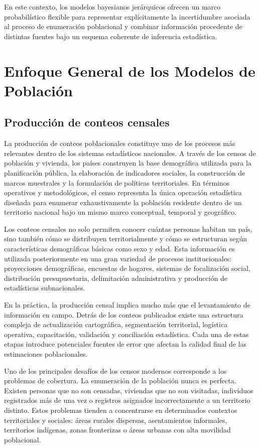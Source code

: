 \documentclass[
  spanish,
]{book}
\begin{document}
En este contexto, los modelos bayesianos jerárquicos ofrecen un marco probabilístico flexible para representar explícitamente la incertidumbre asociada al proceso de enumeración poblacional y combinar información procedente de distintas fuentes bajo un esquema coherente de inferencia estadística.

\chapter{Enfoque General de los Modelos de Población}\label{enfoque-general-de-los-modelos-de-poblaciuxf3n}

\section{Producción de conteos censales}\label{producciuxf3n-de-conteos-censales}

La producción de conteos poblacionales constituye uno de los procesos más relevantes dentro de los sistemas estadísticos nacionales. A través de los censos de población y vivienda, los países construyen la base demográfica utilizada para la planificación pública, la elaboración de indicadores sociales, la construcción de marcos muestrales y la formulación de políticas territoriales. En términos operativos y metodológicos, el censo representa la única operación estadística diseñada para enumerar exhaustivamente la población residente dentro de un territorio nacional bajo un mismo marco conceptual, temporal y geográfico.

Los conteos censales no solo permiten conocer cuántas personas habitan un país, sino también cómo se distribuyen territorialmente y cómo se estructuran según características demográficas básicas como sexo y edad. Esta información es utilizada posteriormente en una gran variedad de procesos institucionales: proyecciones demográficas, encuestas de hogares, sistemas de focalización social, distribución presupuestaria, delimitación administrativa y producción de estadísticas subnacionales.

En la práctica, la producción censal implica mucho más que el levantamiento de información en campo. Detrás de los conteos publicados existe una estructura compleja de actualización cartográfica, segmentación territorial, logística operativa, capacitación, validación y conciliación estadística. Cada una de estas etapas introduce potenciales fuentes de error que afectan la calidad final de las estimaciones poblacionales.

Uno de los principales desafíos de los censos modernos corresponde a los problemas de cobertura. La enumeración de la población nunca es perfecta. Existen personas que no son censadas, viviendas que no son visitadas, individuos registrados más de una vez o registros asignados incorrectamente a un territorio distinto. Estos problemas tienden a concentrarse en determinados contextos territoriales y sociales: áreas rurales dispersas, asentamientos informales, territorios indígenas, zonas fronterizas o áreas urbanas con alta movilidad poblacional.
\end{document}
